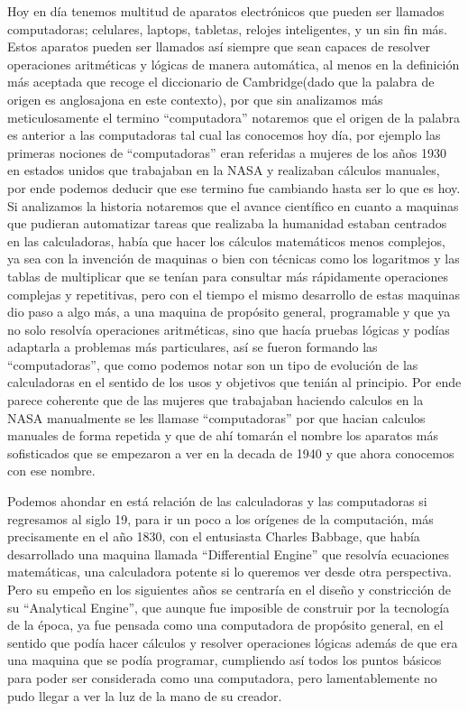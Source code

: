 \documentclass[letterpaper,12pt,oneside]{book}
\begin{document}
	Hoy en día tenemos multitud de aparatos electrónicos que pueden ser llamados computadoras; celulares, laptops, tabletas, relojes inteligentes, y un sin fin más. 
	Estos aparatos pueden ser llamados así siempre que sean  capaces de resolver operaciones aritméticas y lógicas de manera automática, al menos en la definición
	más aceptada que recoge el diccionario de Cambridge(dado que la palabra de origen es anglosajona en este contexto),
	por que sin analizamos más meticulosamente el termino ``computadora''  notaremos que el origen de la palabra es anterior a las computadoras
	tal cual las conocemos hoy día, por ejemplo las primeras nociones de ``computadoras''  eran referidas a mujeres de los años 1930 en estados unidos
	que trabajaban en la NASA y realizaban cálculos manuales, por ende podemos deducir que ese termino fue cambiando hasta ser lo que es hoy.
	Si analizamos la historia notaremos que el avance científico en cuanto a maquinas
	que pudieran automatizar tareas que realizaba la humanidad estaban centrados en las calculadoras, había que hacer los cálculos matemáticos menos
	complejos, ya sea con la invención de maquinas o bien con técnicas como los logaritmos y las tablas de multiplicar que se tenían
	para consultar más rápidamente operaciones complejas y repetitivas, pero con el tiempo el mismo desarrollo de estas maquinas dio paso a algo más,
	a una maquina de propósito general, programable y que ya no solo resolvía operaciones aritméticas, sino que hacía pruebas lógicas y podías
	adaptarla a problemas más particulares, así se fueron formando las ``computadoras'', que como podemos notar son un tipo de evolución de las calculadoras en el sentido de los usos y objetivos
	que tenián al principio. Por ende parece coherente que	de las mujeres que trabajaban haciendo calculos en la NASA manualmente se les llamase ``computadoras'' por que hacian calculos manuales
	de forma repetida y que de ahí tomarán el nombre los aparatos más sofisticados que se empezaron a ver en la decada de 1940 y que ahora conocemos con ese nombre.
	
	
	Podemos ahondar en está relación de las calculadoras y las computadoras si regresamos al siglo 19, para ir un poco a los orígenes de la computación,
    más precisamente en el año 1830, con el entusiasta Charles Babbage, que había desarrollado una maquina llamada ``Differential Engine''
	que resolvía ecuaciones matemáticas, una calculadora potente si lo queremos ver desde otra perspectiva. Pero su empeño en los siguientes años 
	se centraría en el diseño y constricción
	de su ``Analytical Engine'', que aunque fue imposible de construir por la tecnología de la época, ya fue pensada como una computadora
	de propósito general, en el sentido que podía hacer cálculos y resolver operaciones lógicas además de que era una maquina que se podía programar,
	cumpliendo así todos los puntos básicos para poder ser considerada como una computadora, pero lamentablemente no pudo llegar a ver la luz de la mano
	de su creador.
	
\end{document}
